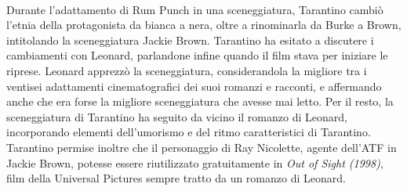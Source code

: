 \documentclass[12pt]{article} %
\begin{document}
\begin{flushleft}
    \\\vspace{1cm}
    Durante l'adattamento di Rum Punch in una sceneggiatura, Tarantino cambiò l'etnia della protagonista da bianca a nera, oltre a rinominarla da Burke a Brown, intitolando la sceneggiatura Jackie Brown. Tarantino ha esitato a discutere i cambiamenti con Leonard, parlandone infine quando il film stava per iniziare le riprese. Leonard apprezzò la sceneggiatura, considerandola la migliore tra i ventisei adattamenti cinematografici dei suoi romanzi e racconti, e affermando anche che era forse la migliore sceneggiatura che avesse mai letto. Per il resto, la sceneggiatura di Tarantino ha seguito da vicino il romanzo di Leonard, incorporando elementi dell'umorismo e del ritmo caratteristici di Tarantino. Tarantino permise inoltre che il personaggio di Ray Nicolette, agente dell'ATF in Jackie Brown, potesse essere riutilizzato gratuitamente in \textit{Out of Sight (1998)}, film della Universal Pictures sempre tratto da un romanzo di Leonard. 
\end{flushleft}
\break
\end{document}
